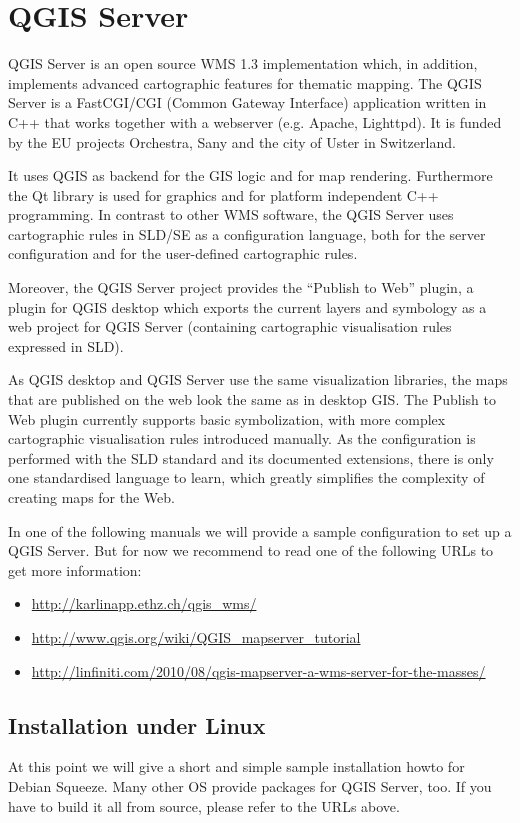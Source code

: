 
\chapter{QGIS Server}\label{label_qgisserver}

\updatedisclaimer

QGIS Server is an open source WMS 1.3 implementation which, in addition,
implements advanced cartographic features for thematic mapping. The QGIS
Server is a FastCGI/CGI (Common Gateway Interface) application written in
C++ that works together with a webserver (e.g. Apache, Lighttpd). It is 
funded by the EU projects Orchestra, Sany and the city of Uster in 
Switzerland.

It uses QGIS as backend for the GIS logic and for map rendering. Furthermore the 
Qt library is used for graphics and for platform independent 
C++ programming. In contrast to other WMS software, the QGIS Server uses 
cartographic rules in SLD/SE as a configuration language, both for the server 
configuration and for the user-defined cartographic rules. 

Moreover, the QGIS Server project provides the “Publish to Web” plugin, a 
plugin for QGIS desktop which exports the current layers and symbology as a 
web project for QGIS Server (containing cartographic visualisation rules 
expressed in SLD).

As QGIS desktop and QGIS Server use the same visualization libraries, the
maps that are published on the web look the same as in desktop GIS. The 
Publish to Web plugin currently supports basic symbolization, with more complex 
cartographic visualisation rules introduced manually. As the configuration is 
performed with the SLD standard and its documented extensions, there is only 
one standardised language to learn, which greatly simplifies the complexity 
of creating maps for the Web.

In one of the following manuals we will provide a sample configuration to 
set up a QGIS Server. But for now we recommend to read one of the following 
URLs to get more information:

\begin{itemize}
\item \url{http://karlinapp.ethz.ch/qgis\_wms/} \\
\item \url{http://www.qgis.org/wiki/QGIS\_mapserver\_tutorial} \\
\item \url{http://linfiniti.com/2010/08/qgis-mapserver-a-wms-server-for-the-masses/}
\end{itemize}

\section{Installation under Linux}

At this point we will give a short and simple sample installation howto for 
Debian Squeeze. Many other OS provide packages for QGIS Server, too. If you have to 
build it all from source, please refer to the URLs above.  

\FloatBarrier
